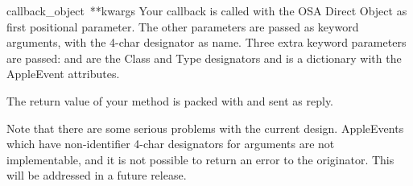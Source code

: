 \begin{funcdesc}{callback}{_object\, **kwargs}
Your callback is called with the OSA Direct Object as first positional
parameter. The other parameters are passed as keyword arguments, with
the 4-char designator as name. Three extra keyword parameters are
passed:  and  are the Class and Type
designators and  is a dictionary with the AppleEvent
attributes.

The return value of your method is packed with
 and sent as reply.
\end{funcdesc}

Note that there are some serious problems with the current
design. AppleEvents which have non-identifier 4-char designators for
arguments are not implementable, and it is not possible to return an
error to the originator. This will be addressed in a future release.
